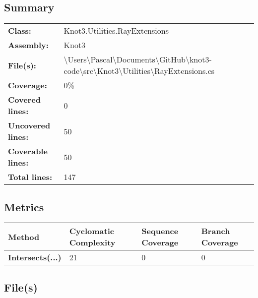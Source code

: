 \documentclass[a4paper,10pt]{article}
\begin{document}
\subsection{Summary}
\begin{longtable}[l]{ll}
\textbf{Class:} & Knot3.Utilities.RayExtensions\\
\textbf{Assembly:} & Knot3\\
\textbf{File(s):} & \begin{minipage}[t]{12cm}{\textbackslash Users\textbackslash Pascal\textbackslash Documents\textbackslash GitHub\textbackslash knot3-code\textbackslash src\textbackslash Knot3\textbackslash Utilities\textbackslash RayExtensions.cs}\end{minipage} \\
\textbf{Coverage:} & 0\%\\
\textbf{Covered lines:} & 0\\
\textbf{Uncovered lines:} & 50\\
\textbf{Coverable lines:} & 50\\
\textbf{Total lines:} & 147\\
\end{longtable}
\subsection{Metrics}
\begin{longtable}[l]{|l|l|l|l|}
\hline
\textbf{Method} & \textbf{Cyclomatic Complexity} & \textbf{Sequence Coverage} & \textbf{Branch Coverage}\\
\hline
\textbf{Intersects(...)} & 21 & 0 & 0\\
\hline
\end{longtable}
\subsection{File(s)}
\end{document}
